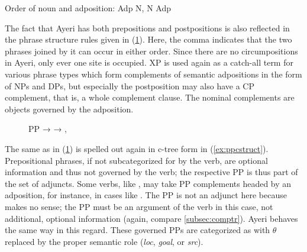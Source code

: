 \ex
Order of noun and adposition: Adp N, N Adp
\xe

The fact that Ayeri has both prepositions and postpositions is also reflected
in the phrase structure rules given in (\ref{ex:pppstruct}). Here, the comma
indicates that the two phrases joined by it can occur in either order. Since
there are no circumpositions in Ayeri, only ever one site is occupied. XP is
used again as a catch-all term for various phrase types which form complements
of semantic adpositions in the form of NPs and DPs, but especially the
postposition  may also have a CP complement, that is,
a whole complement clause. The nominal complements are objects governed by the
adposition.

\begin{figure}[h]
\pex\label{ex:pppstruct}
\a PP →  
\a {} → , 
\xe
\end{figure}

The same as in (\ref{ex:pppstruct}) is spelled out again in c-tree form in
(\ref{ex:ppcstruct}). Prepositional phrases, if not subcategorized for by the
verb, are optional information and thus not governed by the verb; the
respective PP is thus part of the set of adjuncts. Some verbs, like
, may take PP complements headed by an adposition, for
instance, in cases like . The PP
 is not an adjunct here because 
makes no sense; the PP must be an argument of the verb in this case, not
additional, optional information (again, compare \autoref{subsec:comptr}).
Ayeri behaves the same way in this regard. These governed PPs are categorized
as \Oblique{} with $\theta$ replaced by the proper semantic role
(\textit{loc}, \textit{goal}, or \textit{src}).

